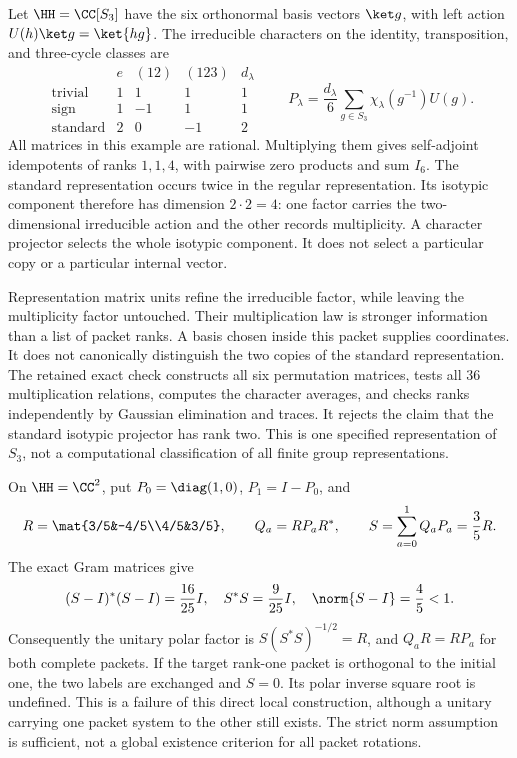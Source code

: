 Let $\HH=\CC[S_3]$ have the six orthonormal basis vectors $\ket g$, with left action $U(h)\ket g=\ket{hg}$. The irreducible characters on the identity, transposition, and three-cycle classes are
\[
\begin{array}{c|rrr|r}
 & e & (12)&(123)&d_\lambda\\\hline
\text{trivial}&1&1&1&1\\
\text{sign}&1&-1&1&1\\
\text{standard}&2&0&-1&2
\end{array}
\qquad
P_\lambda=\frac{d_\lambda}{6}\sum_{g\in S_3}\chi_\lambda(g^{-1})U(g).
\]
All matrices in this example are rational. Multiplying them gives self-adjoint idempotents of ranks $1,1,4$, with pairwise zero products and sum $I_6$.
The standard representation occurs twice in the regular representation. Its isotypic component therefore has dimension $2\cdot2=4$: one factor carries the two-dimensional irreducible action and the other records multiplicity. A character projector selects the whole isotypic component. It does not select a particular copy or a particular internal vector.

Representation matrix units refine the irreducible factor, while leaving the multiplicity factor untouched. Their multiplication law is stronger information than a list of packet ranks. A basis chosen inside this packet supplies coordinates. It does not canonically distinguish the two copies of the standard representation.
The retained exact check constructs all six permutation matrices, tests all $36$ multiplication relations, computes the character averages, and checks ranks independently by Gaussian elimination and traces. It rejects the claim that the standard isotypic projector has rank two. This is one specified representation of $S_3$, not a computational classification of all finite group representations.

On $\HH=\CC^2$, put $P_0=\diag(1,0)$, $P_1=I-P_0$, and
\[
R=\mat{3/5&-4/5\\4/5&3/5},\qquad Q_a=RP_aR^*,
\qquad S=\sum_{a=0}^1Q_aP_a=\frac35R.
\]
The exact Gram matrices give
\[
(S-I)^*(S-I)=\frac{16}{25}I,\quad S^*S=\frac9{25}I,
\quad\norm{S-I}=\frac45<1.
\]
Consequently the unitary polar factor is $S(S^*S)^{-1/2}=R$, and $Q_aR=RP_a$ for both complete packets.
If the target rank-one packet is orthogonal to the initial one, the two labels are exchanged and $S=0$. Its polar inverse square root is undefined. This is a failure of this direct local construction, although a unitary carrying one packet system to the other still exists. The strict norm assumption is sufficient, not a global existence criterion for all packet rotations.

